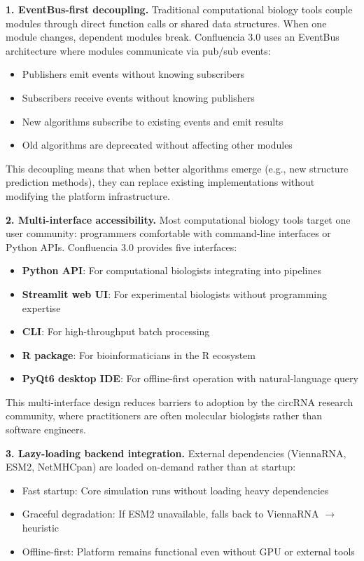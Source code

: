 \documentclass[12pt]{article}
\begin{document}
\textbf{1. EventBus-first decoupling.} Traditional computational biology tools couple modules through direct function calls or shared data structures. When one module changes, dependent modules break. Confluencia 3.0 uses an EventBus architecture where modules communicate via pub/sub events:

\begin{itemize}
\item Publishers emit events without knowing subscribers
\item Subscribers receive events without knowing publishers
\item New algorithms subscribe to existing events and emit results
\item Old algorithms are deprecated without affecting other modules
\end{itemize}

This decoupling means that when better algorithms emerge (e.g., new structure prediction methods), they can replace existing implementations without modifying the platform infrastructure.

\textbf{2. Multi-interface accessibility.} Most computational biology tools target one user community: programmers comfortable with command-line interfaces or Python APIs. Confluencia 3.0 provides five interfaces:

\begin{itemize}
\item \textbf{Python API}: For computational biologists integrating into pipelines
\item \textbf{Streamlit web UI}: For experimental biologists without programming expertise
\item \textbf{CLI}: For high-throughput batch processing
\item \textbf{R package}: For bioinformaticians in the R ecosystem
\item \textbf{PyQt6 desktop IDE}: For offline-first operation with natural-language query
\end{itemize}

This multi-interface design reduces barriers to adoption by the circRNA research community, where practitioners are often molecular biologists rather than software engineers.

\textbf{3. Lazy-loading backend integration.} External dependencies (ViennaRNA, ESM2, NetMHCpan) are loaded on-demand rather than at startup:

\begin{itemize}
\item Fast startup: Core simulation runs without loading heavy dependencies
\item Graceful degradation: If ESM2 unavailable, falls back to ViennaRNA $\rightarrow$ heuristic
\item Offline-first: Platform remains functional even without GPU or external tools
\end{itemize}
\end{document}
